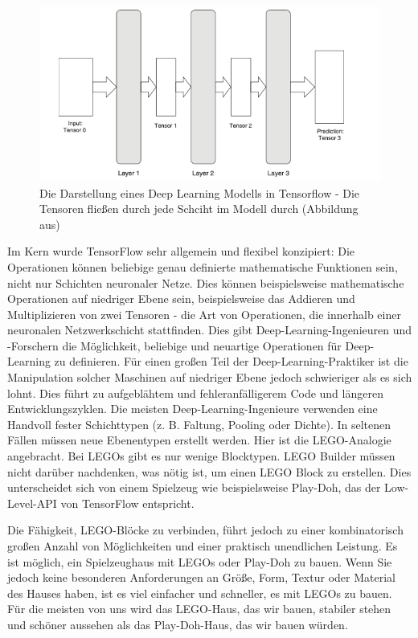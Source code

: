  \begin{figure}[H]
     \centering
     \includegraphics[width=13cm]{kapitel5/tflayers.png}
     \caption[Die Darstellung eines Deep Learning Modells in Tensorflow]{Die Darstellung eines Deep Learning Modells in Tensorflow - Die Tensoren fließen durch jede Schciht im Modell durch (Abbildung aus)}
     \label{Kap5:tnflayers}
 \end{figure}


Im Kern wurde TensorFlow sehr allgemein und flexibel konzipiert: Die Operationen können beliebige genau definierte mathematische Funktionen sein, nicht nur Schichten neuronaler Netze. Dies können beispielsweise mathematische Operationen auf niedriger Ebene sein, beispielsweise das Addieren und Multiplizieren von zwei Tensoren - die Art von Operationen, die innerhalb einer neuronalen Netzwerkschicht stattfinden. Dies gibt Deep-Learning-Ingenieuren und -Forschern die Möglichkeit, beliebige und neuartige Operationen für Deep-Learning zu definieren. Für einen großen Teil der Deep-Learning-Praktiker ist die Manipulation solcher Maschinen auf niedriger Ebene jedoch schwieriger als es sich lohnt. Dies führt zu aufgeblähtem und fehleranfälligerem Code und längeren Entwicklungszyklen. Die meisten Deep-Learning-Ingenieure verwenden eine Handvoll fester Schichttypen (z. B. Faltung, Pooling oder Dichte). In seltenen Fällen müssen neue Ebenentypen erstellt werden. Hier ist die LEGO-Analogie angebracht. Bei LEGOs gibt es nur wenige Blocktypen. LEGO Builder müssen nicht darüber nachdenken, was nötig ist, um einen LEGO Block zu erstellen. Dies unterscheidet sich von einem Spielzeug wie beispielsweise Play-Doh, das der Low-Level-API von TensorFlow entspricht.

Die Fähigkeit, LEGO-Blöcke zu verbinden, führt jedoch zu einer kombinatorisch großen Anzahl von Möglichkeiten und einer praktisch unendlichen Leistung. Es ist möglich, ein Spielzeughaus mit LEGOs oder Play-Doh zu bauen. Wenn Sie jedoch keine besonderen Anforderungen an Größe, Form, Textur oder Material des Hauses haben, ist es viel einfacher und schneller, es mit LEGOs zu bauen. Für die meisten von uns wird das LEGO-Haus, das wir bauen, stabiler stehen und schöner aussehen als das Play-Doh-Haus, das wir bauen würden.

